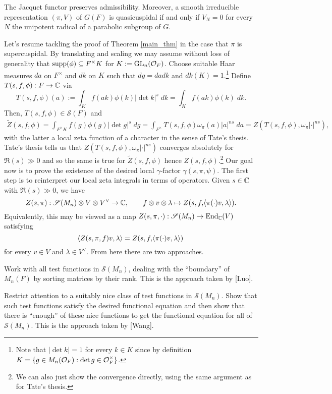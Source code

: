 \documentclass[11pt]{article}
\renewcommand{\S}{\mathscr{S}}
\newcommand{\supp}{\textup{supp}}
\newcommand{\twid}{\widetilde}
\begin{document}
\begin{theorem}[Jacquet]
The Jacquet functor preserves admissibility. Moreover, a smooth irreducible representation $(\pi,V)$ of $G(F)$ is quasicuspidal if and only if $V_N=0$ for every $N$ the unipotent radical of a parabolic subgroup of $G$.
\end{theorem}

Let's resume tackling the proof of Theorem \ref{main_thm} in the case that $\pi$ is supercuspidal. By translating and scaling we may assume without loss of generality that $\supp(\phi)\subset F^{\times}K$ for $K:=\textup{GL}_n(\mathcal{O}_F)$. Choose suitable Haar measures $da$ on $F^{\times}$ and $dk$ on $K$ such that $dg=dadk$ and $dk(K)=1$.\footnote{Note that $|\det k|=1$ for every $k\in K$ since by definition $K=\{g\in M_n(\mathcal{O}_F) : \det g\in\mathcal{O}_F^{\times}\}$.} Define $T(s,f,\phi): F\to\mathbb{C}$ via 
$$T(s,f,\phi)(a):=\int_Kf(ak)\phi(k)|\det k|^s\;dk=\int_Kf(ak)\phi(k)\;dk.$$
Then, $T(s,f,\phi)\in\S(F)$ and 
\begin{align*}
\twid{Z}(s,f,\phi)
=\int_{F^{\times}K}f(g)\phi(g)|\det g|^s\;dg
=\int_{F^{\times}}T(s,f,\phi)\omega_{\pi}(a)|a|^{ns}\;da
=Z(T(s,f,\phi),\omega_{\pi}|\cdot|^{ns}),
\end{align*}
with the latter a local zeta function of a character in the sense of Tate's thesis. Tate's thesis tells us that $Z(T(s,f,\phi),\omega_{\pi}|\cdot|^{ns})$ converges absolutely for $\Re(s)\gg0$ and so the same is true for $\twid{Z}(s,f,\phi)$ hence $Z(s,f,\phi)$.\footnote{We can also just show the convergence directly, using the same argument as for Tate's thesis.} Our goal now is to prove the existence of the desired local $\gamma$-factor $\gamma(s,\pi,\psi)$. The first step is to reinterpret our local zeta integrals in terms of operators. Given $s\in\mathbb{C}$ with $\Re(s)\gg0$, we have 
$$Z(s,\pi): \S(M_n)\tensor V\tensor V^{\vee}\to\C,\qquad f\tensor v\tensor\lambda\mapsto Z(s,f,\ip{\pi(\cdot)v,\lambda}).$$
Equivalently, this may be viewed as a map $Z(s,\pi,\cdot): \S(M_n)\to\End_{\C}(V)$ satisfying 
$$\!\left\langle Z(s,\pi,f)v,\lambda\right\rangle=Z(s,f,\!\left\langle\pi(\cdot)v,\lambda\right\rangle)$$
for every $v\in V$ and $\lambda\in V^{\vee}$. From here there are two approaches.
\begin{enum}{\arabic}
\item Work with all test functions in $\S(M_n)$, dealing with the ``boundary'' of $M_n(F)$ by sorting matrices by their rank. This is the approach taken by [Luo].

\item Restrict attention to a suitably nice class of test functions in $\S(M_n)$. Show that such test functions satisfy the desired functional equation and then show that there is ``enough'' of these nice functions to get the functional equation for all of $\S(M_n)$. This is the approach taken by [Wang].
\end{enum}
\end{document}
